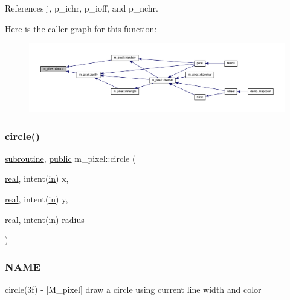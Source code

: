 References j, p\+\_\+ichr, p\+\_\+ioff, and p\+\_\+nchr.

Here is the caller graph for this function\+:
\nopagebreak
\begin{figure}[H]
\begin{center}
\leavevmode
\includegraphics[width=350pt]{namespacem__pixel_ab25c6cce708ff91a79bbabb23d591a8b_icgraph}
\end{center}
\end{figure}
\mbox{\label{namespacem__pixel_ab3b12cc498ed490014aa5fcc0bb278d2}} 
\subsubsection{\texorpdfstring{circle()}{circle()}}
{\footnotesize\ttfamily \hyperlink{M__stopwatch_83_8txt_acfbcff50169d691ff02d4a123ed70482}{subroutine}, \hyperlink{M__stopwatch_83_8txt_a2f74811300c361e53b430611a7d1769f}{public} m\+\_\+pixel\+::circle (\begin{DoxyParamCaption}\item[{\hyperlink{read__watch_83_8txt_abdb62bde002f38ef75f810d3a905a823}{real}, intent(\hyperlink{M__journal_83_8txt_afce72651d1eed785a2132bee863b2f38}{in})}]{x,  }\item[{\hyperlink{read__watch_83_8txt_abdb62bde002f38ef75f810d3a905a823}{real}, intent(\hyperlink{M__journal_83_8txt_afce72651d1eed785a2132bee863b2f38}{in})}]{y,  }\item[{\hyperlink{read__watch_83_8txt_abdb62bde002f38ef75f810d3a905a823}{real}, intent(\hyperlink{M__journal_83_8txt_afce72651d1eed785a2132bee863b2f38}{in})}]{radius }\end{DoxyParamCaption})}



\subsubsection*{N\+A\+ME}

circle(3f) -\/ \mbox{[}M\+\_\+pixel\mbox{]} draw a circle using current line width and color 

